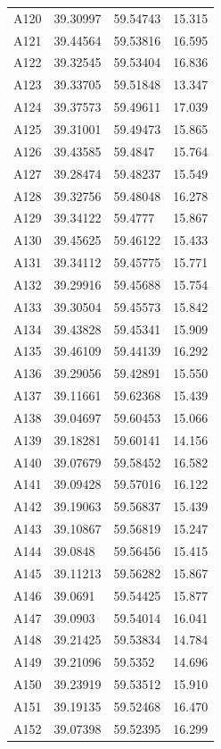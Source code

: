 \documentclass[useAMS,usenatbib]{mn2e}
\begin{document}
\begin{table}
\begin{tabular}{lllc}
	A120 & 39.30997 & 59.54743 & 15.315 \\
	A121 & 39.44564 & 59.53816 & 16.595 \\
	A122 & 39.32545 & 59.53404 & 16.836 \\
	A123 & 39.33705 & 59.51848 & 13.347 \\
	A124 & 39.37573 & 59.49611 & 17.039 \\
	A125 & 39.31001 & 59.49473 & 15.865 \\
	A126 & 39.43585 & 59.4847 & 15.764 \\
	A127 & 39.28474 & 59.48237 & 15.549 \\
	A128 & 39.32756 & 59.48048 & 16.278 \\
	A129 & 39.34122 & 59.4777 & 15.867 \\
	A130 & 39.45625 & 59.46122 & 15.433 \\
	A131 & 39.34112 & 59.45775 & 15.771 \\
	A132 & 39.29916 & 59.45688 & 15.754 \\
	A133 & 39.30504 & 59.45573 & 15.842 \\
	A134 & 39.43828 & 59.45341 & 15.909 \\
	A135 & 39.46109 & 59.44139 & 16.292 \\
	A136 & 39.29056 & 59.42891 & 15.550 \\
	A137 & 39.11661 & 59.62368 & 15.439 \\
	A138 & 39.04697 & 59.60453 & 15.066 \\
	A139 & 39.18281 & 59.60141 & 14.156 \\
	A140 & 39.07679 & 59.58452 & 16.582 \\
	A141 & 39.09428 & 59.57016 & 16.122 \\
	A142 & 39.19063 & 59.56837 & 15.439 \\
	A143 & 39.10867 & 59.56819 & 15.247 \\
	A144 & 39.0848 & 59.56456 & 15.415 \\
	A145 & 39.11213 & 59.56282 & 15.867 \\
	A146 & 39.0691 & 59.54425 & 15.877 \\
	A147 & 39.0903 & 59.54014 & 16.041 \\
	A148 & 39.21425 & 59.53834 & 14.784 \\
	A149 & 39.21096 & 59.5352 & 14.696 \\
	A150 & 39.23919 & 59.53512 & 15.910 \\
	A151 & 39.19135 & 59.52468 & 16.470 \\
	A152 & 39.07398 & 59.52395 & 16.299 \\

\end{tabular}
\end{table}
\end{document}

